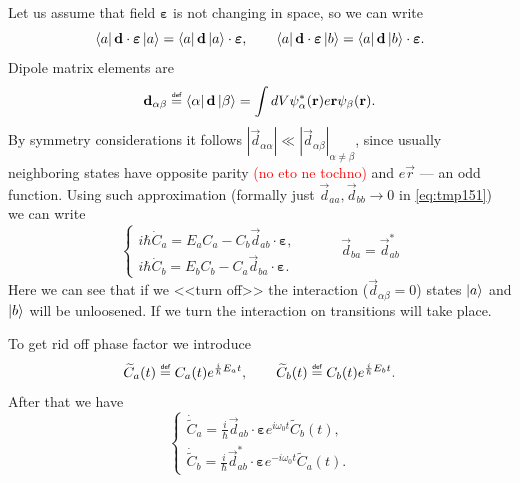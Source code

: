 Let us assume that field $\bm{\varepsilon}$ is not changing in space, so we can write
\begin{equation}
	\left\langle {a} \right\rvert \mathbf{d} \cdot \bm{\varepsilon} \left\lvert {a} \right\rangle = \left\langle {a} \right\rvert \mathbf{d} \left\lvert {a} \right\rangle \cdot \bm{\varepsilon}, \qquad
	\left\langle {a} \right\rvert \mathbf{d} \cdot \bm{\varepsilon} \left\lvert {b} \right\rangle = \left\langle {a} \right\rvert \mathbf{d} \left\lvert {b} \right\rangle \cdot \bm{\varepsilon}.
\end{equation}
Dipole matrix elements are
\begin{equation}
	\vec{d}_{\alpha \beta} \myeq \bra{\alpha} \vec{d} \ket{\beta} = \int dV \psi_{\alpha}^* (\vec{r}) e \vec{r} \psi_{\beta} (\vec{r}).
\end{equation}
By symmetry considerations it follows  $\left| \vec{d}_{\alpha \alpha} \right| \ll \left| \vec{d}_{\alpha \beta} \right|_{\alpha \neq \beta}$, since usually neighboring states have opposite parity \textcolor{red}{(no eto ne tochno)} and $e \vec{r}$ --- an odd function. Using such approximation (formally just $\vec{d}_{aa}, \vec{d}_{bb} \to 0$ in \eqref{eq:tmp151}) we can write
\begin{equation}
	\begin{cases}
		i \hbar \dot{C}_a = E_a C_a - C_b \vec{d}_{ab} \cdot \bm{\varepsilon}, \\
		i \hbar \dot{C}_b = E_b C_b - C_a \vec{d}_{ba} \cdot \bm{\varepsilon}.
	\end{cases}
	\qquad \quad \vec{d}_{ba} = \vec{d}_{ab}^*
\end{equation}
Here we can see that if we <<turn off>> the interaction ($\vec{d}_{\alpha \beta} = 0$) states $\left\lvert {a} \right\rangle$ and $\left\lvert {b} \right\rangle$ will be unloosened. If we turn the interaction on transitions will take place.

To get rid off phase factor we introduce
\begin{equation}
	\widetilde{C}_a (t) \myeq C_a(t) e^{\frac{i}{\hbar}E_a t}, \qquad \widetilde{C}_b (t) \myeq C_b(t) e^{\frac{i}{\hbar}E_bt}.
\end{equation}
After that we have
\begin{equation}
	\begin{cases}
		\dot{\widetilde{C}}_a = \frac{i}{\hbar}\vec{d}_{ab} \cdot \bm{\varepsilon} e^{i \omega_0 t} \widetilde{C}_b(t), \\
		\dot{\widetilde{C}}_b = \frac{i}{\hbar}\vec{d}^*_{ab} \cdot \bm{\varepsilon} e^{-i \omega_0 t} \widetilde{C}_a(t).
	\end{cases}
\end{equation}

